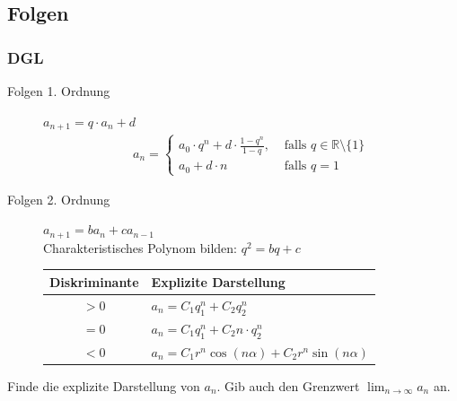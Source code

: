 \documentclass[11pt, a4paper]{article}
\begin{document}
\subsection{Folgen}
\subsubsection{DGL}
\begin{description}
	\item[Folgen 1. Ordnung] $a_{n+1} = q \cdot a_n + d$
		\begin{align*}
			a_n = \begin{cases}
				a_0 \cdot q^n + d \cdot \frac{1-q^n}{1-q}, &\text{ falls } q \in \mathbb{R} \setminus \{1\} \\
				a_0 + d \cdot n &\text{ falls } q=1
					\end{cases}
		\end{align*}
	\item[Folgen 2. Ordnung] $a_{n+1} = b a_n + c a_{n-1}$ \vspace{0.3cm} \\
		Charakteristisches Polynom bilden: $q^2 = bq+c$ \vspace{0.3cm} \\
		\begin{tabular}{|c|l|}
			\hline
			Diskriminante & Explizite Darstellung \\ \hline
			$>0$ & $a_n = C_1 q_1^n + C_2 q_2^n$ \\
			$=0$ & $a_n = C_1 q_1^n + C_2 n \cdot q_2^n$ \\
			$<0$ & $a_n = C_1 r^n \cos(n\alpha) + C_2 r^n \sin(n\alpha)$ \\ \hline
		\end{tabular}
\end{description}
Finde die explizite Darstellung von $a_n$. Gib auch den Grenzwert $\lim_{n \rightarrow \infty} a_n$ an.
\end{document}
